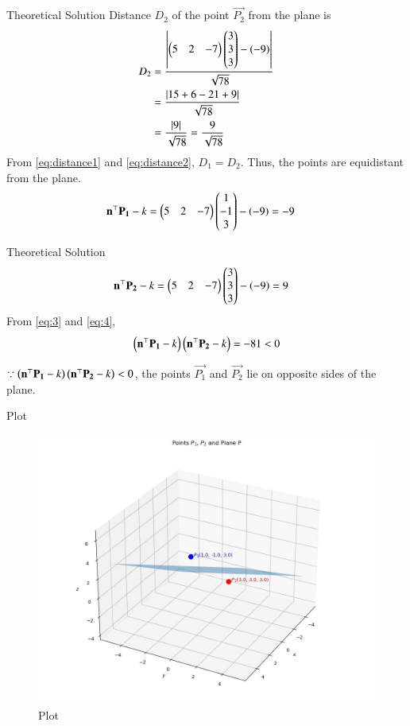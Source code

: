 \documentclass{beamer}
\begin{document}
\begin{frame}{Theoretical Solution}
Distance $D_2$ of the point $\vec{P_2}$ from the plane is
\begin{align}
    D_2 &= \frac{\left\vert\begin{pmatrix}5 & 2 & -7\end{pmatrix}\begin{pmatrix}3 \\ 3 \\ 3\end{pmatrix} - \left(-9\right)\right\vert}{\sqrt{78}} \\
    &= \frac{\left\vert15 + 6 - 21 + 9\right\vert}{\sqrt{78}} \\
    &= \frac{\left\vert9\right\vert}{\sqrt{78}} = \frac{9}{\sqrt{78}} \label{eq:distance2}
\end{align}
From \eqref{eq:distance1} and \eqref{eq:distance2}, $D_1 = D_2$. Thus, the points are equidistant from the plane.
\begin{align}
    \mathbf{n}^\top\mathbf{P_1} - k &= \begin{pmatrix}5 & 2 & -7\end{pmatrix}\begin{pmatrix}1 \\ -1 \\ 3\end{pmatrix} - \left(-9\right) = -9 \label{eq:3}
\end{align}
\end{frame}

\begin{frame}{Theoretical Solution}
\begin{align}
    \mathbf{n}^\top\mathbf{P_2} - k &= \begin{pmatrix}5 & 2 & -7\end{pmatrix}\begin{pmatrix}3 \\ 3 \\ 3\end{pmatrix} - \left(-9\right) = 9 \label{eq:4}
\end{align}
From \eqref{eq:3} and \eqref{eq:4}, 
\begin{align}
    \left(\mathbf{n}^\top\mathbf{P_1}-k\right)\left(\mathbf{n}^\top\mathbf{P_2}-k\right) = -81 < 0
\end{align}

$\because \left(\mathbf{n}^\top\mathbf{P_1}-k\right)\left(\mathbf{n}^\top\mathbf{P_2}-k\right) < 0$, the points $\vec{P_1}$ and $\vec{P_2}$ lie on opposite sides of the plane.
\end{frame}

\begin{frame}{Plot}
    \begin{figure}
        \centering
        \includegraphics[width=0.5\columnwidth]{../figs/plot_c.jpg}
        \caption{Plot}
        \label{fig:fig}
    \end{figure}
\end{frame}
\end{document}
